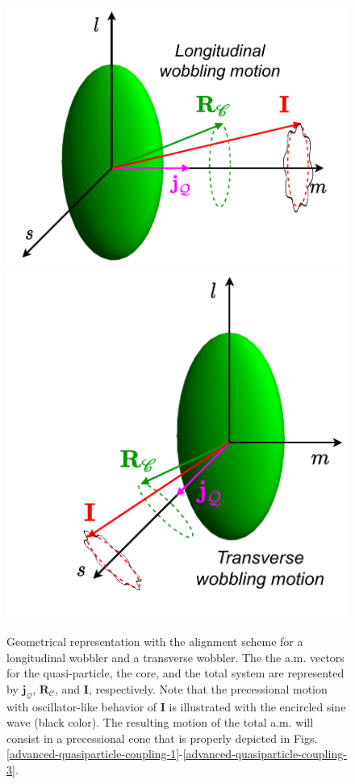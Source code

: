 \begin{figure}
    \centering
    \includegraphics[scale=0.5]{Chapters/Figures/longitudinal_wobbler-schematic.pdf}
    \includegraphics[scale=0.5]{Chapters/Figures/transverse_wobbler-schematic.pdf}
    \caption{Geometrical representation with the alignment scheme for a longitudinal wobbler and a transverse wobbler. The the a.m. vectors for the quasi-particle, the core, and the total system are represented by $\mathbf{j}_\mathcal{Q}$, $\mathbf{R}_\mathscr{C}$, and $\mathbf{I}$, respectively. Note that the precessional motion with oscillator-like behavior of $\mathbf{I}$ is illustrated with the encircled sine wave (black color). The resulting motion of the total a.m. will consist in a precessional cone that is properly depicted in Figs. \ref{advanced-quasiparticle-coupling-1}-\ref{advanced-quasiparticle-coupling-3}.}
    \label{wobbling-oddA-geometry}
\end{figure}

